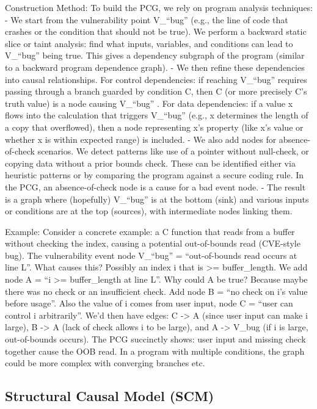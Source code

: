 \documentclass[conference,compsoc]{IEEEtran}
\begin{document}
Construction Method: To build the PCG, we rely on program analysis
techniques: - We start from the vulnerability point V\_``bug'' (e.g.,
the line of code that crashes or the condition that should not be true).
We perform a backward static slice or taint analysis: find what inputs,
variables, and conditions can lead to V\_``bug'' being true. This gives
a dependency subgraph of the program (similar to a backward program
dependence graph). - We then refine these dependencies into causal
relationships. For control dependencies: if reaching V\_``bug'' requires
passing through a branch guarded by condition C, then C (or more
precisely C's truth value) is a node causing V\_``bug'' . For data
dependencies: if a value x flows into the calculation that triggers
V\_``bug'' (e.g., x determines the length of a copy that overflowed),
then a node representing x's property (like x's value or whether x is
within expected range) is included. - We also add nodes for
absence-of-check scenarios. We detect patterns like use of a pointer
without null-check, or copying data without a prior bounds check. These
can be identified either via heuristic patterns or by comparing the
program against a secure coding rule. In the PCG, an absence-of-check
node is a cause for a bad event node. - The result is a graph where
(hopefully) V\_``bug'' is at the bottom (sink) and various inputs or
conditions are at the top (sources), with intermediate nodes linking
them.

Example: Consider a concrete example: a C function that reads from a
buffer without checking the index, causing a potential out-of-bounds
read (CVE-style bug). The vulnerability event node V\_``bug'' =
``out-of-bounds read occurs at line L''. What causes this? Possibly an
index i that is \textgreater= buffer\_length. We add node A = ``i
\textgreater= buffer\_length at line L''. Why could A be true? Because
maybe there was no check or an insufficient check. Add node B = ``no
check on i's value before usage''. Also the value of i comes from user
input, node C = ``user can control i arbitrarily''. We'd then have
edges: C -\textgreater{} A (since user input can make i large), B
-\textgreater{} A (lack of check allows i to be large), and A
-\textgreater{} V\_bug (if i is large, out-of-bounds occurs). The PCG
succinctly shows: user input and missing check together cause the OOB
read. In a program with multiple conditions, the graph could be more
complex with converging branches etc.

\subsection{Structural Causal Model
(SCM)}\label{structural-causal-model-scm}
\end{document}
